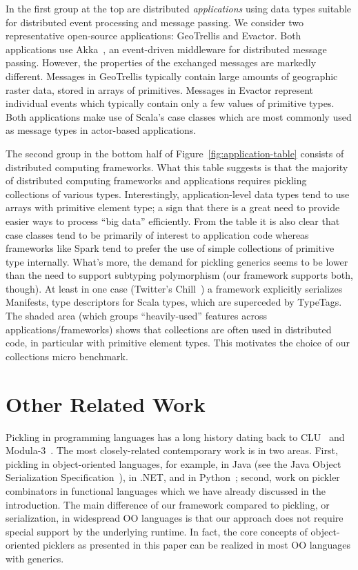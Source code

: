 \documentclass[10pt]{sigplanconf}
\theoremstyle{definition}
\theoremstyle{definition}
\begin{document}
In the first group at the top are distributed \emph{applications}
using data types suitable for distributed event processing and message
passing. We consider two representative open-source applications: GeoTrellis
and Evactor. Both applications use Akka~\cite{Akka}, an
event-driven middleware for distributed message passing. However, the
properties of the exchanged messages are markedly different. Messages
in GeoTrellis typically contain large amounts of geographic raster
data, stored in arrays of primitives. Messages in Evactor represent
individual events which typically contain only a few values of
primitive types. Both applications make use of Scala's case classes
which are most commonly used as message types in actor-based
applications.

The second group in the bottom half of Figure~\ref{fig:application-table}
consists of distributed computing {frameworks}. What this table
suggests is that the majority of distributed computing frameworks and
applications requires pickling collections of various
types. Interestingly, application-level data types tend to use arrays
with primitive element type; a sign that there is a great need to
provide easier ways to process ``big data'' efficiently. From the
table it is also clear that case classes tend to be primarily of
interest to application code whereas frameworks like Spark tend to
prefer the use of simple collections of primitive type
internally. What's more, the demand for pickling generics seems to be
lower than the need to support subtyping polymorphism (our framework
supports both, though). At least in one case (Twitter's Chill~\cite{TwitterChill}) a
framework explicitly serializes Manifests, type descriptors for Scala
types, which are superceded by TypeTags.
The shaded area (which groups ``heavily-used'' features across
applications/frameworks) shows that collections are often used in distributed
code, in particular with primitive element types. This motivates the choice of
our collections micro benchmark.




\section{Other Related Work}
\label{sec:related-work}

Pickling in programming languages has a long history dating back to
CLU~\cite{HerlihyL82} and Modula-3~\cite{CardelliDJKN89}. The most
closely-related contemporary work is in two areas. First, pickling in
object-oriented languages, for example, in Java (see the Java Object
Serialization Specification~\cite{JavaSerialization}), in .NET, and in
Python~\cite{Rossum07}; second, work on pickler combinators in
functional languages which we have already discussed in the
introduction. The main difference of our framework compared to
pickling, or serialization, in widespread OO languages is that our
approach does not require special support by the underlying
runtime. In fact, the core concepts of object-oriented picklers as
presented in this paper can be realized in most OO languages with
generics.
\end{document}
